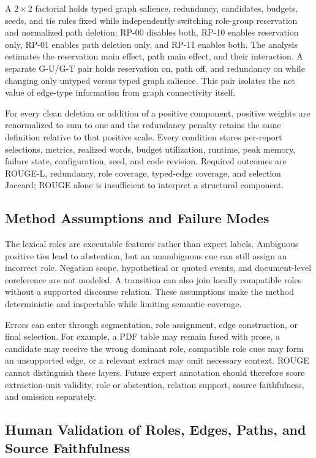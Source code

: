 \documentclass[applsci,article,submit,moreauthors]{Definitions/mdpi}
\begin{document}
A $2\times2$ factorial holds typed graph salience, redundancy, candidates, budgets, seeds, and tie rules fixed while independently switching role-group reservation and normalized path deletion: RP-00 disables both, RP-10 enables reservation only, RP-01 enables path deletion only, and RP-11 enables both. The analysis estimates the reservation main effect, path main effect, and their interaction. A separate G-U/G-T pair holds reservation on, path off, and redundancy on while changing only untyped versus typed graph salience. This pair isolates the net value of edge-type information from graph connectivity itself.

For every clean deletion or addition of a positive component, positive weights are renormalized to sum to one and the redundancy penalty retains the same definition relative to that positive scale. Every condition stores per-report selections, metrics, realized words, budget utilization, runtime, peak memory, failure state, configuration, seed, and code revision. Required outcomes are ROUGE-L, redundancy, role coverage, typed-edge coverage, and selection Jaccard; ROUGE alone is insufficient to interpret a structural component.

\subsection{Method Assumptions and Failure Modes}

The lexical roles are executable features rather than expert labels. Ambiguous positive ties lead to abstention, but an unambiguous cue can still assign an incorrect role. Negation scope, hypothetical or quoted events, and document-level coreference are not modeled. A transition can also join locally compatible roles without a supported discourse relation. These assumptions make the method deterministic and inspectable while limiting semantic coverage.

Errors can enter through segmentation, role assignment, edge construction, or final selection. For example, a PDF table may remain fused with prose, a candidate may receive the wrong dominant role, compatible role cues may form an unsupported edge, or a relevant extract may omit necessary context. ROUGE cannot distinguish these layers. Future expert annotation should therefore score extraction-unit validity, role or abstention, relation support, source faithfulness, and omission separately.

\subsection{Human Validation of Roles, Edges, Paths, and Source Faithfulness}
\end{document}
